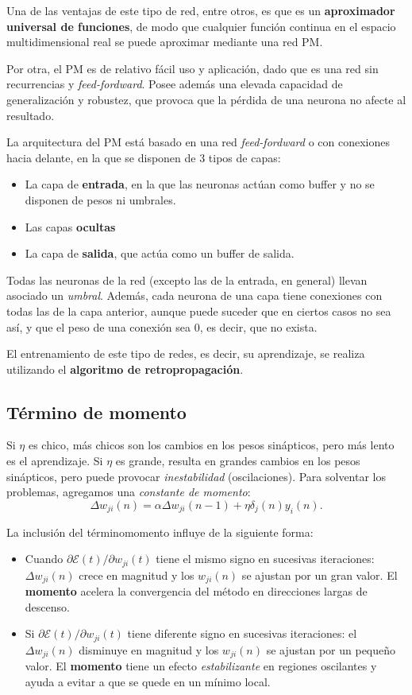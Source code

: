 \documentclass[10pt,a4paper]{article}
\begin{document}
Una de las ventajas de este tipo de red, entre otros, es que es un \textbf{aproximador universal de funciones}, de modo que cualquier función continua en el espacio multidimensional real se puede aproximar mediante una red PM.

Por otra, el PM es de relativo fácil uso y aplicación, dado que es una red sin recurrencias y \textit{feed-fordward}. Posee además una elevada capacidad de generalización y robustez, que provoca que la pérdida de una neurona no afecte al resultado.

La arquitectura del PM está basado en una red \textit{feed-fordward} o con conexiones hacia delante, en la que se disponen de 3 tipos de capas:
\begin{itemize}
\item La capa de \textbf{entrada}, en la que las neuronas actúan como buffer y no se disponen de pesos ni umbrales.
\item Las capas \textbf{ocultas}
\item La capa de \textbf{salida}, que actúa como un buffer de salida.
\end{itemize}

Todas las neuronas de la red (excepto las de la entrada, en general) llevan asociado un \textit{umbral}. Además, cada neurona de una capa tiene conexiones con todas las de la capa anterior, aunque puede suceder que en ciertos casos no sea así, y que el peso de una conexión sea 0, es decir, que no exista.

El entrenamiento de este tipo de redes, es decir, su aprendizaje, se realiza utilizando el \textbf{algoritmo de retropropagación}.

\subsection{Término de momento}
Si $\eta$ es chico, más chicos son los cambios en los pesos sinápticos, pero más lento es el aprendizaje. Si $\eta$ es grande, resulta en grandes cambios en los pesos sinápticos, pero puede provocar \textit{inestabilidad} (oscilaciones). Para solventar los problemas, agregamos una \textit{constante de momento}:
\[\Delta w_{ji}(n)=\alpha \Delta w_{ji}(n-1)+\eta \delta_j(n)y_i(n).\]

La inclusión del términomomento influye de la siguiente forma:

\begin{itemize}
\item Cuando $\partial \mathcal{E} (t) / \partial w_{ji}(t)$ tiene el mismo signo en sucesivas iteraciones: $\Delta w_{ji}(n)$ crece en magnitud y los $w_{ji}(n)$ se ajustan por un gran valor. El \textbf{momento} acelera la convergencia del método en direcciones largas de descenso.
\item Si $\partial \mathcal{E} (t) / \partial w_{ji}(t)$ tiene diferente signo en sucesivas iteraciones: el $\Delta w_{ji}(n)$ disminuye en magnitud y los $w_{ji}(n)$ se ajustan por un pequeño valor. El \textbf{momento} tiene un efecto \textit{estabilizante} en regiones oscilantes y ayuda a evitar a que se quede en un mínimo local.
\end{itemize}
\end{document}
